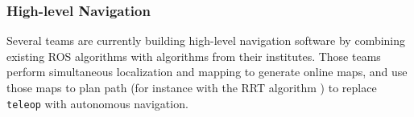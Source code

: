 


\subsubsection*{High-level Navigation}

Several teams \cite{Hinomiyagura2013tdp,MRL2013tdp} are currently building high-level navigation software by combining existing ROS algorithms with 
algorithms from their institutes. %
Those teams perform simultaneous localization and mapping to generate online maps, and use those maps to plan path (for instance with the RRT algorithm \cite{MRL2013tdp}) to replace \texttt{teleop} with autonomous navigation.
